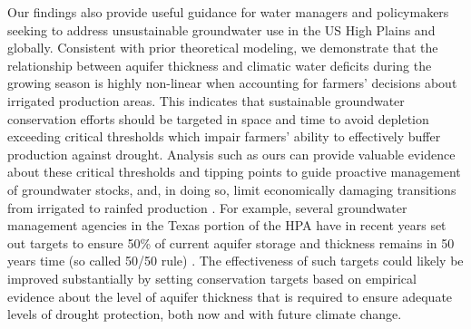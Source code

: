 \documentclass[
]{article}
\begin{document}
Our findings also provide useful guidance for water managers and policymakers seeking to address unsustainable groundwater use in the US High Plains and globally. Consistent with prior theoretical modeling, we demonstrate that the relationship between aquifer thickness and climatic water deficits during the growing season is highly non-linear when accounting for farmers' decisions about irrigated production areas. This indicates that sustainable groundwater conservation efforts \citep{macewan2017hydroecon, butler2020charting, elshall2020groundwater} should be targeted in space and time to avoid depletion exceeding critical thresholds which impair farmers' ability to effectively buffer production against drought. Analysis such as ours can provide valuable evidence about these critical thresholds and tipping points to guide proactive management of groundwater stocks, and, in doing so, limit economically damaging transitions from irrigated to rainfed production \citep{foster2017effects, deines2020transitions}. For example, several groundwater management agencies in the Texas portion of the HPA have in recent years set out targets to ensure 50\% of current aquifer storage and thickness remains in 50 years time (so called 50/50 rule) \citep{closas2018chronicle}. The effectiveness of such targets could likely be improved substantially by setting conservation targets based on empirical evidence about the level of aquifer thickness that is required to ensure adequate levels of drought protection, both now and with future climate change.
\end{document}
